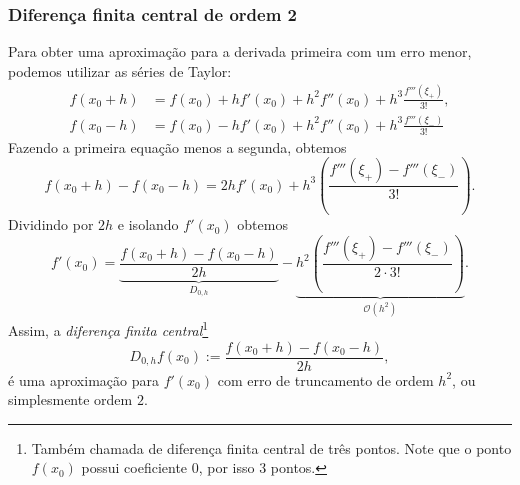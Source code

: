 \subsubsection{Diferença finita central de ordem 2}
Para obter uma aproximação para a derivada primeira com um erro menor, podemos utilizar as séries de Taylor:
\begin{eqnarray*}
    f(x_0+h) &= f(x_0) + hf'(x_0) + h^2f''(x_0) + h^3\frac{f'''(\xi_{+})}{3!},\\
    f(x_0-h) &= f(x_0) - hf'(x_0) + h^2f''(x_0) + h^3\frac{f'''(\xi_{-})}{3!}
\end{eqnarray*}
Fazendo a primeira equação menos a segunda, obtemos
\begin{equation}
  f(x_0+h)-f(x_0-h) = 2hf'(x_0) + h^{3}\left(\frac{f'''(\xi_{+}) - f'''(\xi_{-})}{3!}\right).
\end{equation}
Dividindo por $2h$ e isolando $f'(x_0)$ obtemos
\begin{equation}
  f'(x_0) = \underbrace{\frac{f(x_0+h) - f(x_0-h)}{2h}}_{D_{0,h}} - \underbrace{h^2\left(\frac{f'''(\xi_+) - f'''(\xi_-)}{2\cdot 3!}\right)}_{\mathcal{O}(h^2)}.
\end{equation}
Assim, a \emph{diferença finita central}\footnote{Também chamada de diferença finita central de três pontos. Note que o ponto $f(x_0)$ possui coeficiente $0$, por isso $3$ pontos.}
\begin{equation}
  D_{0,h}f(x_0) := \frac{f(x_0+h)-f(x_0-h)}{2h},
\end{equation}
é uma aproximação para $f'(x_0)$ com erro de truncamento de ordem $h^2$, ou simplesmente ordem $2$.

